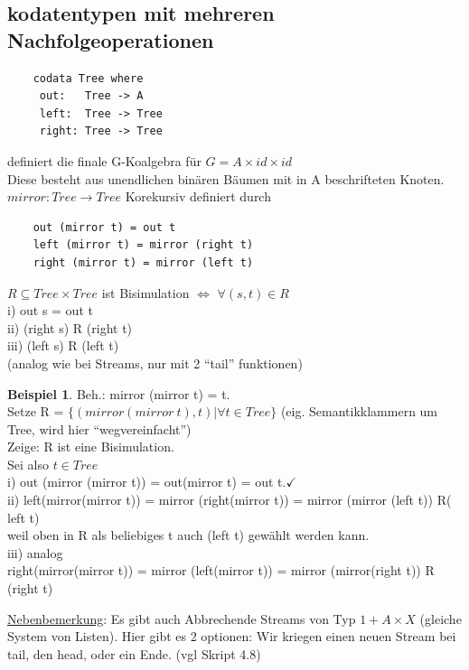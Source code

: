 \documentclass{article}
\theoremstyle{definition}
\newtheorem{beispiel}{Beispiel}[section]
\begin{document}
	\subsection{kodatentypen mit mehreren Nachfolgeoperationen}
	\begin{verbatim}
	codata Tree where
	 out:   Tree -> A
	 left:  Tree -> Tree
	 right: Tree -> Tree
	\end{verbatim}
	definiert die finale G-Koalgebra für $G=A\times id\times id$\\
	Diese besteht aus unendlichen binären Bäumen mit in A beschrifteten Knoten.\\
	$mirror:Tree\to Tree$ Korekursiv definiert durch\\
	\begin{verbatim}
	out (mirror t) = out t
	left (mirror t) = mirror (right t)
	right (mirror t) = mirror (left t)
	\end{verbatim}
	$R\subseteq Tree\times Tree$ ist Bisimulation $\iff$ $\forall(s,t)\in R$\\
	i) out s = out t\\
	ii) (right s) R (right t)\\
	iii) (left s) R (left t)\\
	(analog wie bei Streams, nur mit 2 ``tail'' funktionen)\\
	\begin{beispiel} Beh.: mirror (mirror t) = t.\\
	Setze R = $\{(mirror(mirror\ t),t)|\forall t\in Tree\}$ (eig. Semantikklammern um Tree, wird hier ``wegvereinfacht'')\\
	Zeige: R ist eine Bisimulation.\\
	Sei also $t\in Tree$\\
	i) out (mirror (mirror t)) = out(mirror t) = out t.$\checkmark$\\
	ii) left(mirror(mirror t)) = mirror (right(mirror t)) = mirror (mirror (left t)) R( left t)\\
	weil oben in R als beliebiges t auch (left t) gewählt werden kann.\\
	iii) analog \\
	right(mirror(mirror t)) = mirror (left(mirror t)) = mirror (mirror(right t)) R (right t)\\
	\end{beispiel}
	\underline{Nebenbemerkung}: Es gibt auch Abbrechende Streams von Typ $1+A\times X$ (gleiche System von Listen). Hier gibt es 2 optionen: Wir kriegen einen neuen Stream bei tail, den head, oder ein Ende. (vgl Skript 4.8)\\
\end{document}
